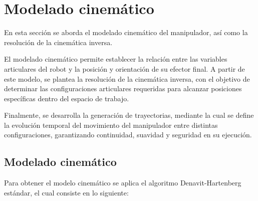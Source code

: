 \documentclass{article}
\begin{document}
\newpage
\section{Modelado cinemático}
\label{sec:cinematica}

En esta sección se aborda el modelado cinemático del manipulador, así como la resolución de la cinemática inversa.

El modelado cinemático permite establecer la relación entre las variables articulares del robot y la posición y orientación de su efector final. A partir de este modelo, se plantea la resolución de la cinemática inversa, con el objetivo de determinar las configuraciones articulares requeridas para alcanzar posiciones específicas dentro del espacio de trabajo.

Finalmente, se desarrolla la generación de trayectorias, mediante la cual se define la evolución temporal del movimiento del manipulador entre distintas configuraciones, garantizando continuidad, suavidad y seguridad en su ejecución.

%
%
\subsection{Modelado cinemático}
\label{sec:modelado_cinematico}

Para obtener el modelo cinemático se aplica el algoritmo Denavit-Hartenberg estándar, el cual consiste en lo siguiente:
\end{document}
